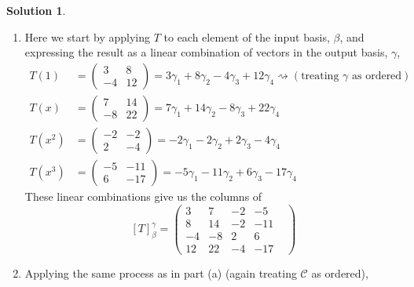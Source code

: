 \documentclass[10pt]{article}
\theoremstyle{definition}
\newtheorem{soln}{Solution}
\begin{document}
\begin{soln}~
  \begin{enumerate}[label=(\alph*)]
    \item Here we start by applying $T$ to each element of the input basis, $\beta$, and expressing the result as a linear combination of vectors in the output basis, $\gamma$,
          \begin{align*}
            T(1)   & =\begin{pmatrix}
                        3  & 8  \\
                        -4 & 12
                      \end{pmatrix} = 3\gamma_1+8\gamma_2-4\gamma_3+12\gamma_4 \rightsquigarrow (\text{treating $\gamma$ as ordered}) \\
            T(x)   & =\begin{pmatrix}
                        7  & 14 \\
                        -8 & 22
                      \end{pmatrix} = 7\gamma_1+14\gamma_2-8\gamma_3+22\gamma_4                                                       \\
            T(x^2) & =\begin{pmatrix}
                        -2 & -2 \\
                        2  & -4
                      \end{pmatrix} = -2\gamma_1-2\gamma_2+2\gamma_3-4\gamma_4                                                        \\
            T(x^3) & =\begin{pmatrix}
                        -5 & -11 \\
                        6  & -17
                      \end{pmatrix} = -5\gamma_1-11\gamma_2+6\gamma_3-17\gamma_4
          \end{align*}
          These linear combinations give us the columns of
          $$\left[T\right]_\beta^\gamma=\begin{pmatrix}
              3  & 7  & -2 & -5    \\
              8  & 14 & -2 & -11 & \\
              -4 & -8 & 2  & 6     \\
              12 & 22 & -4 & -17
            \end{pmatrix}$$
    \item Applying the same process as in part (a) (again treating $\mathcal{C}$ as ordered),

\end{enumerate}
\end{soln}
\end{document}
